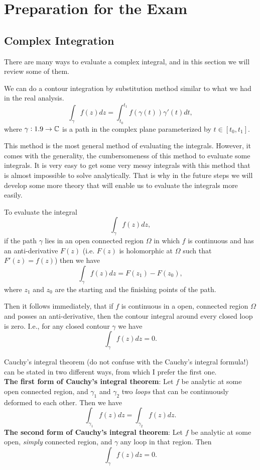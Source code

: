 \section{Preparation for the Exam}


\subsection{Complex Integration}

There are many ways to evaluate a complex integral, and in this section we will review some of them.

\begin{fact}
	We can do a contour integration by substitution method similar to what we had in the real analysis. 
	\[ \int_{\gamma} f(z) dz = \int_{t_0}^{t_1} f(\gamma(t)) \gamma'(t) dt, \]
	where $\gamma:1.9 \to \mathbb{C}$ is a path in the complex plane parameterized by $t \in [t_0,t_1]$.
\end{fact}

This method is the most general method of evaluating the integrals. However, it comes with the generality, the cumbersomeness of this method to evaluate some integrals. It is very easy to get some very messy integrals with this method that is almost impossible to solve analytically. That is why in the future steps we will develop some more theory that will enable us to evaluate the integrals more easily.


\begin{fact}
	To evaluate the integral 
	\[ \int_\gamma f(z) dz, \]
	if the path $\gamma$ lies in an open connected region $\Omega$ in which $f$ is continuous and has an anti-derivative $F(z)$ (i.e. $F(z)$ is holomorphic at $\Omega$ such that $F'(z) = f(z)$) then we have
	\[ \int_\gamma f(z) dz = F(z_1) - F(z_0), \] 
	where $z_1$ and $z_0$ are the starting and the finishing points of the path.
	
\end{fact}

Then it follows immediately, that if $f$ is continuous in a open, connected region $\Omega$ and posses an anti-derivative, then the contour integral around every closed loop is zero. I.e., for any closed contour $\gamma$ we have
\[ \int_\gamma f(z) dz = 0. \]


\begin{fact}
	Cauchy's integral theorem (do not confuse with the Cauchy's integral formula!) can be stated in two different ways, from which I prefer the first one. \\
	\textbf{The first form of Cauchy's integral theorem}: Let $f$ be analytic at some open connected region, and $\gamma_1$ and $\gamma_2$ two \emph{loops} that can be continuously deformed to each other. Then we have
	\[ \int_{\gamma_1} f(z) dz = \int_{\gamma_2} f(z) dz. \]
	\textbf{The second form of Cauchy's integral theorem}: Let $f$ be analytic at some open, \emph{simply} connected region, and $\gamma$ any loop in that region. Then 
	\[ \int_\gamma f(z) dz = 0. \]
	
\end{fact}

